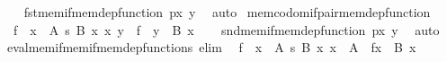 \begin{isabellebody}
%
\isadelimproof
\ \ %
\endisadelimproof
%
\isatagproof
{}\isamarkupfalse%
\ fst{\isacharunderscore}{\kern0pt}mem{\isacharunderscore}{\kern0pt}if{\isacharunderscore}{\kern0pt}mem{\isacharunderscore}{\kern0pt}dep{\isacharunderscore}{\kern0pt}function{\isacharbrackleft}{\kern0pt}\ {\isacharquery}{\kern0pt}p{\isacharequal}{\kern0pt}{\isachardoublequoteopen}{\isasymlangle}x{\isacharcomma}{\kern0pt}\ y{\isasymrangle}{\isachardoublequoteclose}{\isacharbrackright}{\kern0pt}\ \isamarkupfalse%
\ auto%
\endisatagproof
{\isafoldproof}%
%
\isadelimproof
\isanewline
%
\endisadelimproof
\isanewline
{}\isamarkupfalse%
\ mem{\isacharunderscore}{\kern0pt}codom{\isacharunderscore}{\kern0pt}if{\isacharunderscore}{\kern0pt}pair{\isacharunderscore}{\kern0pt}mem{\isacharunderscore}{\kern0pt}dep{\isacharunderscore}{\kern0pt}function{\isacharcolon}{\kern0pt}\isanewline
\ \ {\isachardoublequoteopen}{\isasymlbrakk}f\ {\isasymin}\ {\isacharparenleft}{\kern0pt}x\ {\isasymin}\ A{\isacharparenright}{\kern0pt}\ {\isasymrightarrow}s\ {\isacharparenleft}{\kern0pt}B\ x{\isacharparenright}{\kern0pt}{\isacharsemicolon}{\kern0pt}\ {\isasymlangle}x{\isacharcomma}{\kern0pt}\ y{\isasymrangle}\ {\isasymin}\ f{\isasymrbrakk}\ {\isasymLongrightarrow}\ y\ {\isasymin}\ B\ x{\isachardoublequoteclose}\isanewline
%
\isadelimproof
\ \ %
\endisadelimproof
%
\isatagproof
{}\isamarkupfalse%
\ snd{\isacharunderscore}{\kern0pt}mem{\isacharunderscore}{\kern0pt}if{\isacharunderscore}{\kern0pt}mem{\isacharunderscore}{\kern0pt}dep{\isacharunderscore}{\kern0pt}function{\isacharbrackleft}{\kern0pt}\ {\isacharquery}{\kern0pt}p{\isacharequal}{\kern0pt}{\isachardoublequoteopen}{\isasymlangle}x{\isacharcomma}{\kern0pt}\ y{\isasymrangle}{\isachardoublequoteclose}{\isacharbrackright}{\kern0pt}\ \isamarkupfalse%
\ auto%
\endisatagproof
{\isafoldproof}%
%
\isadelimproof
\isanewline
%
\endisadelimproof
\isanewline
{}\isamarkupfalse%
\ eval{\isacharunderscore}{\kern0pt}mem{\isacharunderscore}{\kern0pt}if{\isacharunderscore}{\kern0pt}mem{\isacharunderscore}{\kern0pt}if{\isacharunderscore}{\kern0pt}mem{\isacharunderscore}{\kern0pt}dep{\isacharunderscore}{\kern0pt}functions\ {\isacharbrackleft}{\kern0pt}elim{\isacharbrackright}{\kern0pt}{\isacharcolon}{\kern0pt}\isanewline
\ \ {\isachardoublequoteopen}{\isasymlbrakk}f\ {\isasymin}\ {\isacharparenleft}{\kern0pt}x\ {\isasymin}\ A{\isacharparenright}{\kern0pt}\ {\isasymrightarrow}s\ {\isacharparenleft}{\kern0pt}B\ x{\isacharparenright}{\kern0pt}{\isacharsemicolon}{\kern0pt}\ x\ {\isasymin}\ A{\isasymrbrakk}\ {\isasymLongrightarrow}\ f{\isacharbackquote}{\kern0pt}x\ {\isasymin}\ B\ x{\isachardoublequoteclose}\isanewline

\end{isabellebody}
